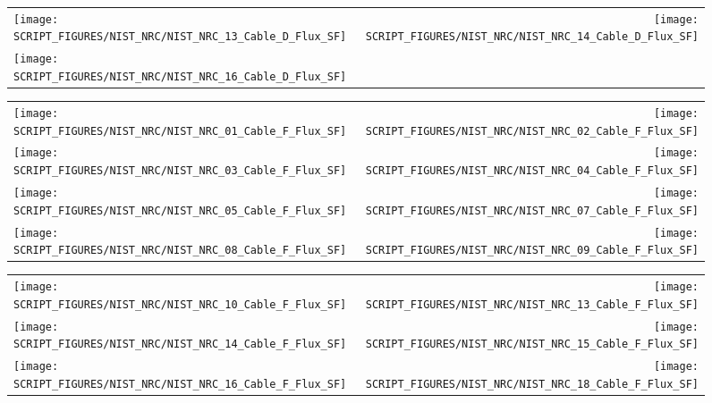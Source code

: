 \begin{figure}[!ht]
\begin{tabular*}{\textwidth}{l@{\extracolsep{\fill}}r}
\texttt{[image: SCRIPT\_FIGURES/NIST\_NRC/NIST\_NRC\_13\_Cable\_D\_Flux\_SF]} &
\texttt{[image: SCRIPT\_FIGURES/NIST\_NRC/NIST\_NRC\_14\_Cable\_D\_Flux\_SF]} \\
\texttt{[image: SCRIPT\_FIGURES/NIST\_NRC/NIST\_NRC\_16\_Cable\_D\_Flux\_SF]}
\end{tabular*}
\end{figure}

\begin{figure}[!ht]
\begin{tabular*}{\textwidth}{l@{\extracolsep{\fill}}r}
\texttt{[image: SCRIPT\_FIGURES/NIST\_NRC/NIST\_NRC\_01\_Cable\_F\_Flux\_SF]} &
\texttt{[image: SCRIPT\_FIGURES/NIST\_NRC/NIST\_NRC\_02\_Cable\_F\_Flux\_SF]} \\
\texttt{[image: SCRIPT\_FIGURES/NIST\_NRC/NIST\_NRC\_03\_Cable\_F\_Flux\_SF]} &
\texttt{[image: SCRIPT\_FIGURES/NIST\_NRC/NIST\_NRC\_04\_Cable\_F\_Flux\_SF]} \\
\texttt{[image: SCRIPT\_FIGURES/NIST\_NRC/NIST\_NRC\_05\_Cable\_F\_Flux\_SF]} &
\texttt{[image: SCRIPT\_FIGURES/NIST\_NRC/NIST\_NRC\_07\_Cable\_F\_Flux\_SF]} \\
\texttt{[image: SCRIPT\_FIGURES/NIST\_NRC/NIST\_NRC\_08\_Cable\_F\_Flux\_SF]} &
\texttt{[image: SCRIPT\_FIGURES/NIST\_NRC/NIST\_NRC\_09\_Cable\_F\_Flux\_SF]}
\end{tabular*}
\end{figure}

\begin{figure}[!ht]
\begin{tabular*}{\textwidth}{l@{\extracolsep{\fill}}r}
\texttt{[image: SCRIPT\_FIGURES/NIST\_NRC/NIST\_NRC\_10\_Cable\_F\_Flux\_SF]} &
\texttt{[image: SCRIPT\_FIGURES/NIST\_NRC/NIST\_NRC\_13\_Cable\_F\_Flux\_SF]} \\
\texttt{[image: SCRIPT\_FIGURES/NIST\_NRC/NIST\_NRC\_14\_Cable\_F\_Flux\_SF]} &
\texttt{[image: SCRIPT\_FIGURES/NIST\_NRC/NIST\_NRC\_15\_Cable\_F\_Flux\_SF]} \\
\texttt{[image: SCRIPT\_FIGURES/NIST\_NRC/NIST\_NRC\_16\_Cable\_F\_Flux\_SF]} &
\texttt{[image: SCRIPT\_FIGURES/NIST\_NRC/NIST\_NRC\_18\_Cable\_F\_Flux\_SF]}
\end{tabular*}
\end{figure}

